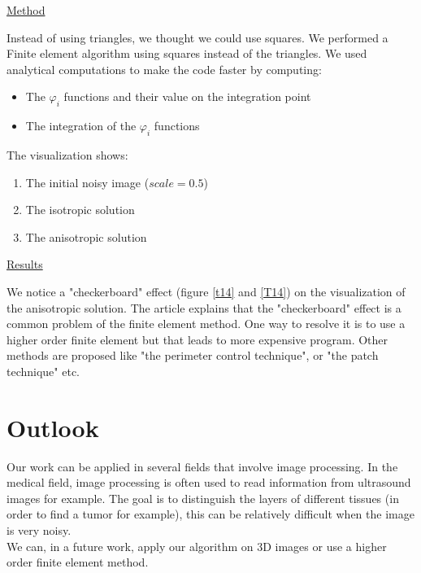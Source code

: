 \documentclass{report}
\renewcommand\phi{\varphi}
\begin{document}
\underline{Method}

Instead of using triangles, we thought we could use squares. We performed a Finite element algorithm using squares instead of the triangles. We used analytical computations to make the code faster by computing: 

\begin{itemize}
    \item 
    The $\phi_i$ functions and their value on the integration point 
    \item 
    The integration of the $\phi_i$ functions 
    
\end{itemize}

The visualization shows: 
\begin{enumerate}
\item 
The initial noisy image ($scale=0.5$)
\item 
The isotropic solution 
\item 
The anisotropic solution
\end{enumerate}



\underline{Results}

We notice a "checkerboard" effect (figure \ref{t14} and \ref{T14}) on the visualization of the anisotropic solution. The article \cite{Shukla13} explains that the "checkerboard" effect is a common problem of the finite element method. One way to resolve it is to use a higher order finite element but that leads to more expensive program. Other methods are proposed like "the perimeter control technique", or "the patch technique" etc. 



\section{Outlook}

Our work can be applied in several fields that involve image processing. In the medical field, image processing is often used to read information from ultrasound images for example. The goal is to distinguish the layers of different tissues (in order to find a tumor for example), this can be relatively difficult when the image is very noisy. \\

We can, in a future work, apply our algorithm on 3D images or use a higher order finite element method. \\
\end{document}
